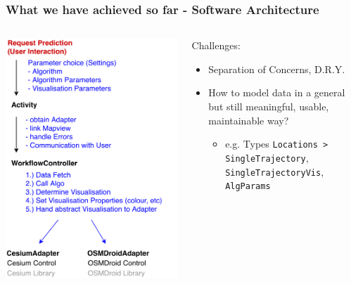 \documentclass[xcolor=dvipsnames]{beamer}
\begin{document}
\begin{frame}
	\frametitle{What we have achieved so far - Software Architecture}
	\begin{columns}
	\begin{column}{0.5\textwidth}
		\includegraphics[width=\textwidth]{diagrams/controller-flow.pdf}
	\end{column}
	\begin{column}{0.5\textwidth}
		\fontsize{9pt}{7.2}\selectfont
		Challenges: 
		\begin{itemize} 
			\item Separation of Concerns, D.R.Y.
		 	 \item How to model data in a general but still meaningful, usable, maintainable way?
		 	 \begin{itemize}
		 	 	\item e.g. Types \lstinline$Locations > SingleTrajectory$, \lstinline$SingleTrajectoryVis$, \lstinline$AlgParams$
		 	 \end{itemize}
		\end{itemize} 
 	\end{column}
	\end{columns}
\end{frame}
\end{document}
